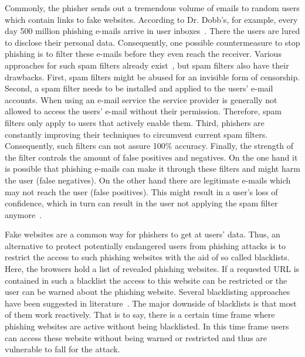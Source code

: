 \begin{description}[leftmargin=0cm]
	\item[Spam filters] Commonly, the phisher sends out a tremendous volume of emails to random users which contain links to fake websites.
According to Dr. Dobb's, for example, every day 500 million phishing e-mails arrive in user inboxes~\cite{drdobb2012email}.
 There the users are lured to disclose their personal data.
 Consequently, one possible countermeasure to stop phishing is to filter these e-mails before they even reach the receiver.
 Various approaches for such spam filters already exist~\cite{bergholz2010new,chandrasekaran2006phishing,fette2007learning}, but spam filters also have their drawbacks.
 First, spam filters might be abused for an invisible form of censorship.
 Second, a spam filter needs to be installed and applied to the users' e-mail accounts.
 When using an e-mail service the service provider is generally not allowed to access the users' e-mail without their permission.
 Therefore, spam filters only apply to users that actively enable them.
 Third, phishers are constantly improving their techniques to circumvent current spam filters.
 Consequently, such filters can not assure 100\% accuracy.
 Finally, the strength of the filter controls the amount of false positives and negatives.
 On the one hand it is possible that phishing e-mails can make it through these filters and might harm the user (false negatives). 
On the other hand there are legitimate e-mails which may not reach the user (false positives). 
This might result in a user's loss of confidence, which in turn can result in the user not applying the spam filter anymore~\cite{olivo2011obtaining}.
	\item[Blacklists] Fake websites are a common way for phishers to get at users' data.
 Thus, an alternative to protect potentially endangered users from phishing attacks is to restrict the access to such phishing websites with the aid of so called blacklists.
 Here, the browsers hold a list of revealed phishing websites.
 If a requested URL is contained in such a blacklist the access to this website can be restricted or the user can be warned about the phishing website.
 Several blacklisting approaches have been suggested in literature~\cite{ma2009beyond, zhang2008highly}. The major downside of blacklists is that most of them work reactively.
 That is to say, there is a certain time frame where phishing websites are active without being blacklisted.
 In this time frame users can access these website without being warned or restricted and thus are vulnerable to fall for the attack.

\end{description}
